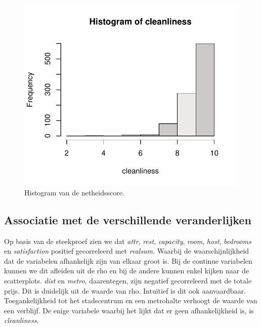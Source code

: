 \documentclass[a4paper]{kulakarticle}
\begin{document}
	\begin{figure}
		\centering
		\includegraphics{Figuren/cleanliness_hist.pdf}
		\caption{Histogram van de netheidsscore.}
		\label{fig:cleanliness}
	\end{figure}
	
	\subsection{Associatie met de verschillende veranderlijken}
	
	Op basis van de steekproef zien we dat \textit{attr}, \textit{rest}, \textit{capacity}, \textit{room}, \textit{host}, \textit{bedrooms} en \textit{satisfaction} positief gecorreleerd met \textit{realsum}. Waarbij de waarschijnlijkheid dat de variabelen afhankelijk zijn van elkaar groot is. Bij de continue variabelen kunnen we dit afleiden uit de rho en bij de andere kunnen enkel kijken naar de scatterplots.  \textit{dist} en \textit{metro}, daarentegen, zijn negatief gecorreleerd met de totale prijs. Dit is duidelijk uit de waarde van rho. Intuïtief is dit ook aanvaardbaar. Toegankelijkheid tot het stadscentrum en een metrohalte verhoogt de waarde van een verblijf. De enige variabele waarbij het lijkt dat er geen afhankelijkheid is, is \textit{cleanliness}.
\end{document}

